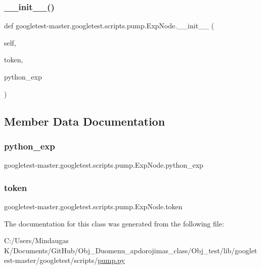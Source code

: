 \subsubsection{\texorpdfstring{\_\_init\_\_()}{\_\_init\_\_()}}
{\footnotesize\ttfamily def googletest-\/master.\+googletest.\+scripts.\+pump.\+Exp\+Node.\+\_\+\+\_\+init\+\_\+\+\_\+ (\begin{DoxyParamCaption}\item[{}]{self,  }\item[{}]{token,  }\item[{}]{python\+\_\+exp }\end{DoxyParamCaption})}



\subsection{Member Data Documentation}
\mbox{\label{classgoogletest-master_1_1googletest_1_1scripts_1_1pump_1_1_exp_node_ab52fb2fffdcd982d59cedaa4fc1b1fb4}} 
\subsubsection{\texorpdfstring{python\_exp}{python\_exp}}
{\footnotesize\ttfamily googletest-\/master.\+googletest.\+scripts.\+pump.\+Exp\+Node.\+python\+\_\+exp}

\mbox{\label{classgoogletest-master_1_1googletest_1_1scripts_1_1pump_1_1_exp_node_aff68803d5407cf30c7788bab9d914256}} 
\subsubsection{\texorpdfstring{token}{token}}
{\footnotesize\ttfamily googletest-\/master.\+googletest.\+scripts.\+pump.\+Exp\+Node.\+token}



The documentation for this class was generated from the following file\+:\begin{DoxyCompactItemize}
\item 
C\+:/\+Users/\+Mindaugas K/\+Documents/\+Git\+Hub/\+Obj\+\_\+\+Duomenu\+\_\+apdorojimas\+\_\+class/\+Obj\+\_\+test/lib/googletest-\/master/googletest/scripts/\mbox{\hyperlink{_obj__test_2lib_2googletest-master_2googletest_2scripts_2pump_8py}{pump.\+py}}\end{DoxyCompactItemize}
